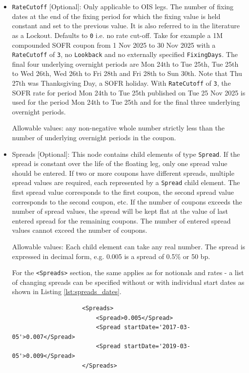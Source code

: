 \begin{itemize}
  Allowable values: any non-negative integer number of days, e.g. \lstinline!0D!, \lstinline!1D!, ...

\item \lstinline!RateCutoff! [Optional]: Only applicable to OIS legs. The number of fixing dates at the end of the 
  fixing period for which the fixing value is held constant and set to the previous value.
  It is also referred to in the literature as a Lockout.
  Defaults to \lstinline!0! i.e. no rate cut-off.
  Take for example a 1M compounded SOFR coupon from 1 Nov 2025 to 30 Nov 2025 with a \lstinline!RateCutoff! of 
  \lstinline!3!, no \lstinline!Lookback! and no externally specified \lstinline!FixingDays!. The final four 
  underlying overnight periods are Mon 24th to Tue 25th, Tue 25th to Wed 26th, Wed 26th to Fri 28th and Fri 28th to 
  Sun 30th. Note that Thu 27th was Thanksgiving Day, a SOFR holiday. With \lstinline!RateCutoff! of \lstinline!3!, 
  the SOFR rate for period Mon 24th to Tue 25th published on Tue 25 Nov 2025 is used for the period Mon 24th to 
  Tue 25th and for the final three underlying overnight periods.

  Allowable values: any non-negative whole number strictly less than the number of underlying overnight periods in the coupon.

\item Spreads [Optional]: This node contains child elements of type
  \lstinline!Spread!. If the spread is constant over the life of the
  floating leg, only one spread value should be entered. If two or more
  coupons have different spreads, multiple spread values are required,
  each represented by a \lstinline!Spread! child element. The first
  spread value corresponds to the first coupon, the second spread
  value corresponds to the second coupon, etc. If the number of
  coupons exceeds the number of spread values, the spread will be kept
  flat at the value of last entered spread for the remaining coupons.
  The number of entered spread values cannot exceed the number of
  coupons.

  Allowable values: Each child element can take any real number. The spread is expressed in decimal form, e.g. 0.005 is
  a spread of 0.5\% or 50 bp.

For the {\tt <Spreads>} section, the same applies as for notionals and
rates - a list of changing spreads can be specified without or with individual start dates as shown
in Listing \ref{lst:spreads_dates}.
\begin{listing}[H]
\begin{verbatim}
                    <Spreads>
                        <Spread>0.005</Spread>
                        <Spread startDate='2017-03-05'>0.007</Spread>
                        <Spread startDate='2019-03-05'>0.009</Spread>
                    </Spreads>
\end{verbatim}
\caption{'Dated' spreads}
\label{lst:spreads_dates}
\end{listing}


\end{itemize}
